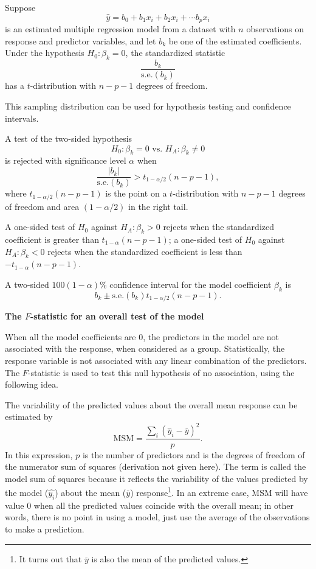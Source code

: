 \begin{termBox}{
Suppose 
\[
\hat{y} = b_0 + b_1 x_{i} + b_2 x_{i} +\cdots b_p x_{i}
\]
is an estimated multiple regression model from a dataset with $n$ observations on response and predictor variables, and let $b_k$ be one of the estimated coefficients.  Under the hypothesis $H_0: \beta_k = 0$, the standardized statistic
\[
      \frac{b_k}{\textrm{s.e.}(b_k)}
\]
has a $t$-distribution with $n - p - 1$ degrees of freedom.}
\end{termBox}

This sampling distribution can be used for hypothesis testing and confidence intervals.

\begin{termBox}{
A test of the two-sided hypothesis
\[
  H_0: \beta_k = 0 \text{ vs. } H_A: \beta_k \ne 0
\]
is rejected with significance level $\alpha$ when 
\[
     \frac{|b_k|}{\textrm{s.e.}(b_k)} > t_{1 - \alpha/2}(n - p - 1),
\]
where $t_{1 - \alpha/2}(n - p - 1)$ is the point on a $t$-distribution with $n - p - 1$ degrees of freedom and area $(1 - \alpha/2)$ in the right tail.}
\end{termBox}

A one-sided test of $H_0$ against $H_A: \beta_k > 0$  rejects when the standardized coefficient is greater than  $t_{1 - \alpha}(n - p - 1)$; a one-sided test of $H_0$ against $H_A: \beta_k < 0$  rejects when the standardized coefficient is less than $-t_{1 - \alpha}(n - p - 1)$.

\begin{termBox}{
A two-sided $100(1 - \alpha)$\% confidence interval for the model coefficient $\beta_k$ is 
\[
     b_k \pm {\textrm{s.e.}(b_k)} t_{1 - \alpha/2}(n - p - 1).
\]}
\end{termBox}


\textbf{The $F$-statistic for an overall test of the model}

When all the model coefficients are 0, the predictors in the model are not associated with the response, when considered as a group.  Statistically, the response variable is not associated with any linear combination of the predictors. The $F$-statistic is used to test this null hypothesis of no association, using the following idea.  

The variability of the predicted values about the overall mean response can be estimated by
\[
   \text{MSM} =  \frac{\sum_i(\hat{y}_i - \overline{y})^2}{p}.
\]
In this expression, $p$ is the number of predictors and is the degrees of freedom of the numerator sum of squares (derivation not given here).  The term  is called the model sum of squares because it reflects the variability of the values predicted by the model ($\hat{y_i}$) about the mean ($\overline{y}$) response\footnote{It turns out that $\overline{y}$ is also the mean of the predicted values.}. In an extreme case, MSM will have value 0 when all the predicted values coincide with the overall mean; in other words, there is no point in using a model, just use the average of the observations to make a prediction.


